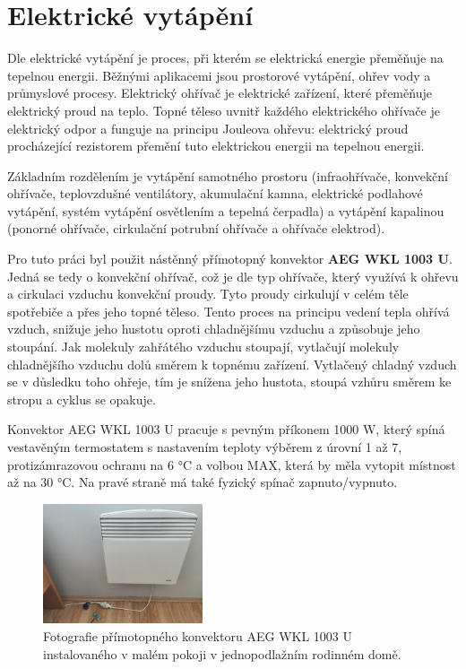 \section{Elektrické vytápění}
Dle \cite{electricHeating} elektrické vytápění je proces, při kterém se elektrická energie přeměňuje na tepelnou energii. Běžnými aplikacemi jsou prostorové vytápění, ohřev vody a průmyslové procesy. Elektrický ohřívač je elektrické zařízení, které přeměňuje elektrický proud na teplo. Topné těleso uvnitř každého elektrického ohřívače je elektrický odpor a funguje na principu Jouleova ohřevu: elektrický proud procházející rezistorem přemění tuto elektrickou energii na tepelnou energii.

Základním rozdělením je vytápění samotného prostoru (infraohřívače, konvekční ohřívače, teplovzdušné ventilátory, akumulační kamna, elektrické podlahové vytápění, systém vytápění osvětlením a tepelná čerpadla) a vytápění kapalinou (ponorné ohřívače, cirkulační potrubní ohřívače a ohřívače elektrod).

Pro tuto práci byl použit nástěnný přímotopný konvektor \textbf{AEG WKL 1003 U}. Jedná se tedy o konvekční ohřívač, což je dle \cite{convectionHeater} typ ohřívače, který využívá k ohřevu a cirkulaci vzduchu konvekční proudy. Tyto proudy cirkulují v celém těle spotřebiče a přes jeho topné těleso. Tento proces na principu vedení tepla ohřívá vzduch, snižuje jeho hustotu oproti chladnějšímu vzduchu a způsobuje jeho stoupání. Jak molekuly zahřátého vzduchu stoupají, vytlačují molekuly chladnějšího vzduchu dolů směrem k topnému zařízení. Vytlačený chladný vzduch se v důsledku toho ohřeje, tím je snížena jeho hustota, stoupá vzhůru směrem ke stropu a cyklus se opakuje.

Konvektor AEG WKL 1003 U pracuje s pevným příkonem 1000 W, který spíná vestavěným termostatem s nastavením teploty výběrem z úrovní 1 až 7, protizámrazovou ochranu na 6 °C a volbou MAX, která by měla vytopit místnost až na 30 °C. Na pravé straně má také fyzický spínač zapnuto/vypnuto.

\begin{figure}[H]
\centering
\includegraphics[width=0.42\textwidth]{obrazky-figures/aeg-wkl-1003u.png}
\caption{Fotografie přímotopného konvektoru AEG WKL 1003 U instalovaného v malém pokoji v jednopodlažním rodinném domě.}
\end{figure}

